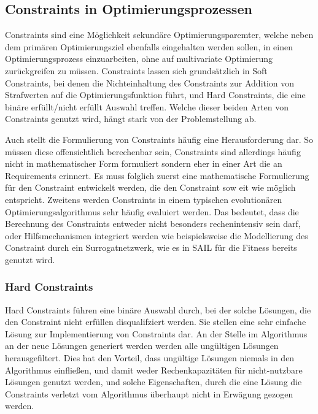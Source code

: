 \subsection{Constraints in Optimierungsprozessen}
Constraints sind eine Möglichkeit sekundäre Optimierungsparemter, welche neben dem primären Optimierungsziel ebenfalls eingehalten werden sollen, in einen Optimierungsprozess einzuarbeiten, ohne auf multivariate Optimierung zurückgreifen zu müssen.
Constraints lassen sich grundsätzlich in Soft Constraints, bei denen die Nichteinhaltung des Constraints zur Addition von Strafwerten auf die Optimierungsfunktion führt, und Hard Constraints, die eine binäre erfüllt/nicht erfüllt Auswahl treffen.
Welche dieser beiden Arten von Constraints genutzt wird, hängt stark von der Problemstellung ab.

Auch stellt die Formulierung von Constraints häufig eine Herausforderung dar.
So müssen diese offensichtlich berechenbar sein, Constraints sind allerdings häufig nicht in mathematischer Form formuliert sondern eher in einer Art die an Requirements erinnert.
Es muss folglich zuerst eine mathematische Formulierung für den Constraint entwickelt werden, die den Constraint sow eit wie möglich entspricht.
Zweitens werden Constraints in einem typischen evolutionären Optimierungsalgorithmus sehr häufig evaluiert werden. Das bedeutet, dass die Berechnung des Constraints entweder nicht besonders rechenintensiv sein darf, oder Hilfsmechanismen integriert werden wie beispielsweise die Modellierung des Constraint durch ein Surrogatnetzwerk, wie es in SAIL für die Fitness bereits genutzt wird.

\subsubsection{Hard Constraints}

Hard Constraints führen eine binäre Auswahl durch, bei der solche Lösungen, die den Constraint nicht erfüllen disqualifziert werden.
Sie stellen eine sehr einfache Lösung zur Implementierung von Constraints dar.
An der Stelle im Algorithmus an der neue Lösungen generiert werden werden alle ungültigen Lösungen herausgefiltert.
Dies hat den Vorteil, dass ungültige Lösungen niemals in den Algorithmus einfließen, und damit weder Rechenkapazitäten für nicht-nutzbare Lösungen genutzt werden, und solche Eigenschaften, durch die eine Lösung die Constraints verletzt vom Algorithmus überhaupt nicht in Erwägung gezogen werden.


